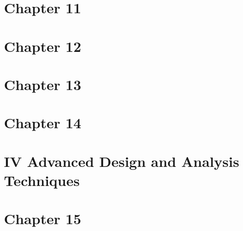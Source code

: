 \documentclass[12pt,a4paper]{article}
\begin{document}




\pagebreak


\section*{Chapter 11}






\pagebreak


\section*{Chapter 12}






\pagebreak

\section*{Chapter 13}






\pagebreak


\section*{Chapter 14}

\pagebreak


\section*{IV Advanced Design and Analysis Techniques}
\pagebreak


\section*{Chapter 15}














\pagebreak
\end{document}
